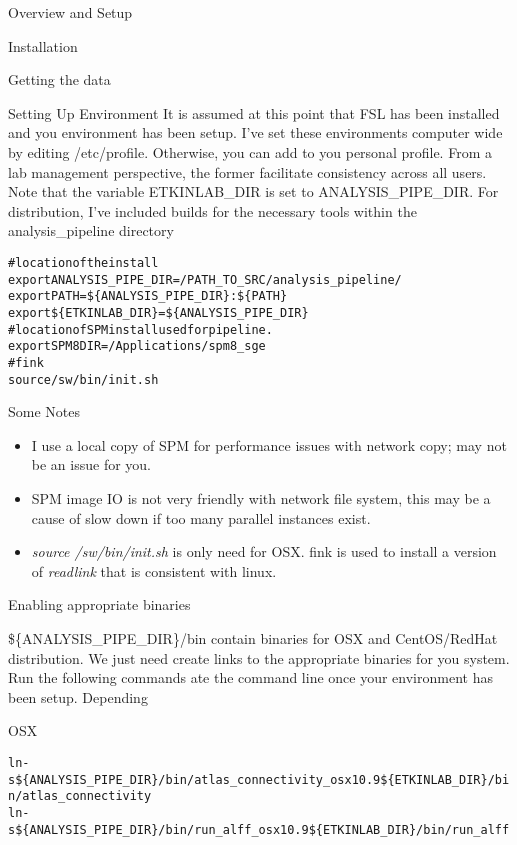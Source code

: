 \documentclass[]{report}
\begin{document}
\begin{chapter}{Overview and Setup}
\begin{section}{Installation}
\begin{subsection}{Getting the data}
\end{subsection}
\begin{subsection}{Setting Up Environment }
It is assumed at this point that FSL has been installed and you environment has been setup. I've set these environments computer wide by editing /etc/profile. Otherwise, you can add to you personal profile. From a lab management perspective, the former facilitate consistency across all users. Note that the variable ETKINLAB\_DIR is set to ANALYSIS\_PIPE\_DIR. For distribution, I've included builds for the necessary tools within the analysis\_pipeline directory
 
\begin{alltt}
#location of the install 
export ANALYSIS\_PIPE\_DIR=/PATH\_TO\_SRC/analysis\_pipeline/
export PATH=\$\{ANALYSIS_PIPE_DIR\}:\$\{PATH\}
export \$\{ETKINLAB\_DIR\}=\$\{ANALYSIS\_PIPE\_DIR\}
#location of SPM install used for pipeline. 
export SPM8DIR=/Applications/spm8\_sge
#fink
source /sw/bin/init.sh
\end{alltt}
{Some Notes}
\begin{itemize}
	\item  I use a local copy of SPM for performance issues with network copy; may not be an issue for you.
	\item  SPM image IO is not very friendly with network file system, this may be a cause of slow down if too many parallel instances exist.
	\item {\it source /sw/bin/init.sh} is only need for OSX. fink is used to install a version of {\it readlink} that is consistent with linux.  
\end{itemize}
\end{subsection}

\end{section}

\begin{section}{Enabling appropriate binaries}

\$\{ANALYSIS\_PIPE\_DIR\}/bin contain binaries for OSX and CentOS/RedHat distribution. We just need create links to the appropriate binaries for you system. 
Run the following commands ate the command line once your environment has been setup. Depending 
\begin{subsubsection}{OSX}
\begin{alltt}
	ln -s \$\{ANALYSIS\_PIPE\_DIR\}/bin/atlas_connectivity_osx10.9 \$\{ETKINLAB\_DIR\}/bin/atlas_connectivity
	ln -s \$\{ANALYSIS\_PIPE\_DIR\}/bin/run_alff_osx10.9 \$\{ETKINLAB\_DIR\}/bin/run_alff
\end{alltt}
\end{subsubsection}


\end{section}
\end{chapter}
\end{document}
